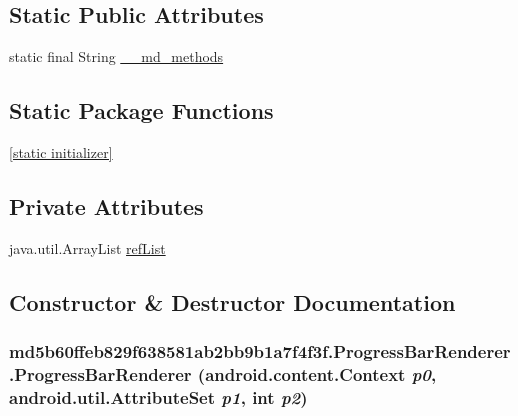 \subsection*{Static Public Attributes}
\begin{CompactItemize}
\item 
static final String \hyperlink{classmd5b60ffeb829f638581ab2bb9b1a7f4f3f_1_1_progress_bar_renderer_81813d61865c0e1c93ba13fd369721ab}{\_\-\_\-md\_\-methods}
\end{CompactItemize}
\subsection*{Static Package Functions}
\begin{CompactItemize}
\item 
\hyperlink{classmd5b60ffeb829f638581ab2bb9b1a7f4f3f_1_1_progress_bar_renderer_a808e9330f77a266b3ee7a1255867f40}{\mbox{[}static initializer\mbox{]}}
\end{CompactItemize}
\subsection*{Private Attributes}
\begin{CompactItemize}
\item 
java.util.ArrayList \hyperlink{classmd5b60ffeb829f638581ab2bb9b1a7f4f3f_1_1_progress_bar_renderer_e911c6372b6bbc32229ca41ddcf09e5f}{refList}
\end{CompactItemize}


\subsection{Constructor \& Destructor Documentation}
\hypertarget{classmd5b60ffeb829f638581ab2bb9b1a7f4f3f_1_1_progress_bar_renderer_941a4c014f87f9892f1b14f44446d83e}{
\subsubsection[{ProgressBarRenderer}]{\setlength{\rightskip}{0pt plus 5cm}md5b60ffeb829f638581ab2bb9b1a7f4f3f.ProgressBarRenderer.ProgressBarRenderer (android.content.Context {\em p0}, \/  android.util.AttributeSet {\em p1}, \/  int {\em p2})}}
\label{classmd5b60ffeb829f638581ab2bb9b1a7f4f3f_1_1_progress_bar_renderer_941a4c014f87f9892f1b14f44446d83e}


